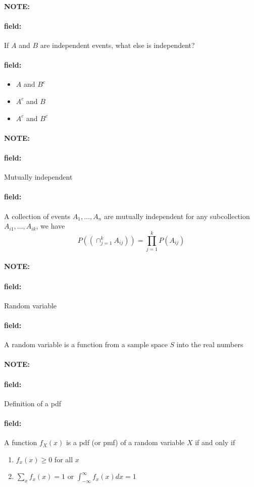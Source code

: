 \documentclass[12pt]{article}
\newenvironment{note}{\paragraph{NOTE:}}{}
\newenvironment{field}{\paragraph{field:}}{}
\begin{document}
\begin{note}
  \begin{field}
    If $A$ and $B$ are independent events, what else is independent?
  \end{field}
  \begin{field}
    \begin{itemize}
      \item $A $ and $B^c$
      \item $A^c$ and $B$
      \item $A^c$ and $B^c$
    \end{itemize}
  \end{field}
\end{note}

\begin{note}
  \begin{field}
    Mutually independent
  \end{field}
  \begin{field}
    A collection of events $A_1, \ldots , A_n$ are mutually independent for any subcollection $A_{i1}, \ldots , A_{ik}$, we have
    $$ P((\cap_{j=1}^k A_{ij})) = \prod_{j=1}^k P(A_{ij}) $$
  \end{field}
\end{note}

\begin{note}
  \begin{field}
    Random variable
  \end{field}
  \begin{field}
    A random variable is a function from a sample space $S$ into the real numbers
  \end{field}
\end{note}

\begin{note}
  \begin{field}
    Definition of a pdf
  \end{field}
  \begin{field}
    A function $f_X(x)$ is a pdf (or pmf) of a random variable $X$ if and only if
    \begin{enumerate}
      \item $f_x(x) \geq 0$ for all $x$
      \item $\sum_x f_x(x) = 1$ or $\int_{-\infty}^\infty f_x(x) dx = 1$
    \end{enumerate}
  \end{field}
\end{note}
\end{document}
